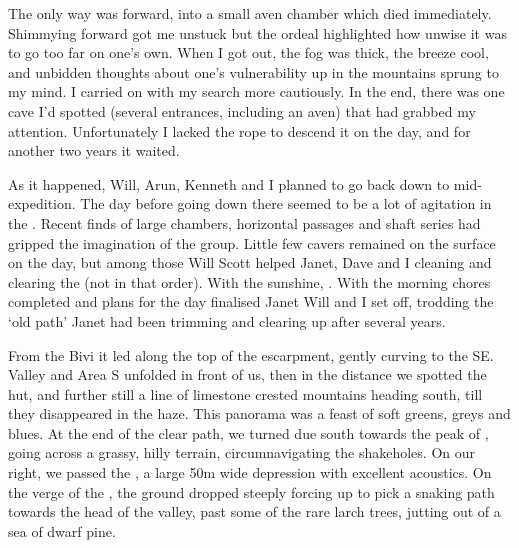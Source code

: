 The only way was forward, into a small aven chamber which died immediately. Shimmying forward got me unstuck but the ordeal highlighted how unwise it was to go too far on one's own. When I got out, the fog was thick, the breeze cool, and unbidden thoughts about one's vulnerability up in the mountains sprung to my mind. I carried on with my search more cautiously. In the end, there was one cave I'd spotted (several entrances, including an aven) that had grabbed my attention. Unfortunately I lacked the rope to descend it on the day, and for another two years it waited.

As it happened, Will, Arun, Kenneth and I planned to go back down to  mid-expedition. The day before going down there seemed to be a lot of agitation in the . Recent finds of large chambers, horizontal passages and shaft series had gripped the imagination of the group. Little few cavers remained on the surface on the day, but among those Will Scott helped Janet, Dave and I cleaning and clearing the  (not in that order). With the sunshine, . With the morning chores completed and plans for the day finalised Janet Will and I set off, trodding the `old  path' Janet had been trimming and clearing up after several years. 

From the Bivi it led along the top of the  escarpment, gently curving to the SE.  Valley and Area S unfolded in front of us, then in the distance we spotted the  hut, and further still a line of limestone crested mountains heading south, till they disappeared in the haze. This panorama was a feast of soft greens, greys and blues. At the end of the clear path, we turned due south towards the peak of , going across a grassy, hilly terrain, circumnavigating the shakeholes. On our right, we passed the , a large 50m wide depression with excellent acoustics. On the verge of the , the ground dropped steeply forcing up to pick a snaking path towards the head of the valley, past some of the rare larch trees, jutting out of a sea of dwarf pine.

